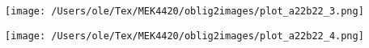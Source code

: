 \vspace{0.5cm} %

\noindent
\begin{minipage}[t]{0.45\linewidth}
    \texttt{[image: /Users/ole/Tex/MEK4420/oblig2images/plot\_a22b22\_3.png]}
\end{minipage}
\hspace{0.05\linewidth}
\begin{minipage}[t]{0.45\linewidth}
    \texttt{[image: /Users/ole/Tex/MEK4420/oblig2images/plot\_a22b22\_4.png]}
\end{minipage} 